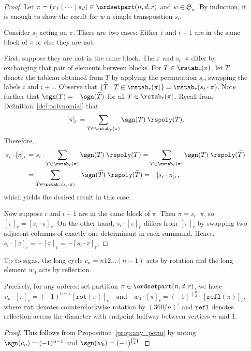 \begin{proof}
Let $\pi=(\pi_1\mid \dots\mid \pi_d)\in\ordsetpart(n,d,r)$ and $w\in \mathfrak{S}_n$. By induction, it is enough to show the result for $w$ a simple transposition $s_i$. 

Consider $s_i$ acting on $\pi$. There are two cases: Either $i$ and $i+1$ are in the same block of $\pi$ or else they are not. 
 
First, suppose they are not in the same block. The $\pi$ and $s_i \cdot \pi$ differ by exchanging that pair of elements between blocks. For $T\in\rstab_r(\pi)$, let $\widetilde{T}$ denote the tableau obtained from $T$ by applying the permutation $s_i$, swapping the labels $i$ and $i+1$.
Observe that $\{ \widetilde{T} : T \in \rstab_r(\pi) \} = \rstab_r(s_i \cdot \pi)$.
Note further that $\sgn(T) = -\sgn(\widetilde{T})$ for all $T \in \rstab_r(\pi)$. 
Recall from Definition~\ref{def:polynomial} that \[[\pi]_r = \sum_{T\in \rstab_r(\pi)}\sgn(T) \; \rspoly(T).\]
Therefore, 
\begin{align*}  s_i \cdot [\pi]_r  &=   s_i \cdot \sum_{T\in \rstab_r(\pi)}\sgn(T) \; \rspoly(T) =  \sum_{T\in \rstab_r(\pi)} \sgn(T) \; \rspoly(\widetilde{T})  \\ &= \sum_{\tilde{T}\in \rstab_r(s_i \cdot \pi)} -\sgn(\widetilde{T}) \; \rspoly(\widetilde{T}) = -[s_i \cdot \pi]_r,
\end{align*}
which yields the desired result in this case.

Now suppose $i$ and $i+1$ are in the same block of $\pi$. Then $\pi = s_i \cdot \pi$, so $[\pi]_r = [s_i \cdot \pi]_r$. On the other hand, $s_i \cdot [\pi]_r$ differs from $[\pi]_r$ by swapping two adjacent columns of exactly one determinant in each summand. Hence, $s_i \cdot [\pi]_r = - [\pi]_r = -[s_i\cdot\pi]_r$.
\end{proof}

\begin{corollary}
\label{prop:rotation}
Up to signs, the long cycle $c_n = n12\dots (n-1)$ acts by rotation and the long element $w_0$ acts by reflection.

Precisely, for any ordered set partition $\pi \in \ordsetpart(n,d,r)$, we have 
\[
c_n \cdot [\pi]_r = (-1)^{n-1} [\mathtt{rot}(\pi)]_r \quad \text{and} \quad w_0 \cdot [\pi]_r = (-1)^{\binom{n}{2}} [\mathtt{refl}(\pi)]_r,
\]
where $\mathtt{rot}$ denotes counterclockwise rotation by $(360/n)^\circ$ and $\mathtt{refl}$ denotes reflection across the diameter with endpoint halfway between vertices $n$ and $1$.
\end{corollary}
\begin{proof}
This follows from Proposition~\ref{prop:any_perm} by noting $\sgn(c_n)=(-1)^{n-1}$ and $\sgn(w_0)=(-1)^{\binom{n}{2}}$.
\end{proof}


